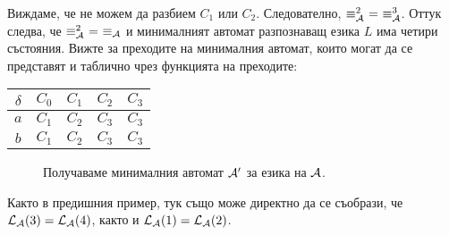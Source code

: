 \begin{extra2}
\begin{solution}
\begin{itemize}
      
      Виждаме, че не можем да разбием $C_1$ или $C_2$.
      Следователно, $\equiv^2_\A\ =\ \equiv^3_\A$.
      Оттук следва, че $\equiv^2_{\mathcal{A}}\ =\ \equiv_{\mathcal{A}}$ и минималният автомат разпознаващ езика $L$
      има четири състояния. Вижте  за преходите на минималния автомат,
      които могат да се представят и таблично чрез функцията на преходите:

      \begin{tabular}{|c|c|c|c|c|}
        \hline
        $\delta$ & $C_0$ & $C_1$ & $C_2$ & $C_3$ \\
        \hline
        $a$ & $C_1$ & $C_2$ & $C_3$ & $C_3$ \\
        \hline
        $b$ & $C_1$ & $C_2$ & $C_3$ & $C_3$ \\
        \hline
      \end{tabular}
    \end{itemize}

    \begin{figure}[H]
      \centering
      \caption{Получаваме минималния автомат $\mathcal{A}'$ за езика на $\mathcal{A}$.}
      \label{fig:min2}
    \end{figure}

  \end{solution}
  
  \begin{remark}
    Както в предишния пример, тук също може директно да се съобрази, че $\mathcal{L}_{\mathcal{A}}(3) = \mathcal{L}_{\mathcal{A}}(4)$,
    както и $\mathcal{L}_{\mathcal{A}}(1) = \mathcal{L}_{\mathcal{A}}(2)$.
  \end{remark}

\end{extra2}


